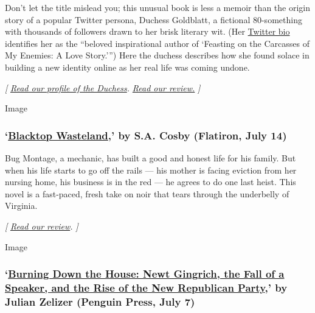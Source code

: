 Don't let the title mislead you; this unusual book is less a memoir than
the origin story of a popular Twitter persona, Duchess Goldblatt, a
fictional 80-something with thousands of followers drawn to her brisk
literary wit. (Her \href{https://twitter.com/duchessgoldblat}{Twitter
bio} identifies her as the ``beloved inspirational author of `Feasting
on the Carcasses of My Enemies: A Love Story.''') Here the duchess
describes how she found solace in building a new identity online as her
real life was coming undone.

\emph{{[}}
\href{https://www.nytimes.com/2020/07/01/books/becoming-duchess-goldblatt-memoir.html}{\emph{Read
our profile of the Duchess}}\emph{. \textbar{}}
\href{https://www.nytimes.com/2020/07/07/books/review/becoming-duchess-goldblatt-anonymous.html}{\emph{Read
our review.}} \emph{{]}}

Image

\hypertarget{blacktop-wasteland-by-sa-cosby-flatiron-july-14}{%
\subsubsection{\texorpdfstring{`\href{https://us.macmillan.com/books/9781250252685}{Blacktop
Wasteland},' by S.A. Cosby (Flatiron, July
14)}{`Blacktop Wasteland,' by S.A. Cosby (Flatiron, July 14)}}\label{blacktop-wasteland-by-sa-cosby-flatiron-july-14}}

Bug Montage, a mechanic, has built a good and honest life for his
family. But when his life starts to go off the rails --- his mother is
facing eviction from her nursing home, his business is in the red --- he
agrees to do one last heist. This novel is a fast-paced, fresh take on
noir that tears through the underbelly of Virginia.

\emph{{[}}
\href{https://www.nytimes.com/2020/07/17/books/review/blacktop-wasteland-s-a-crosby.html}{\emph{Read
our review}}\emph{. {]}}

Image

\hypertarget{burning-down-the-house-newt-gingrich-the-fall-of-a-speaker-and-the-rise-of-the-new-republican-party-by-julian-zelizer-penguin-press-july-7}{%
\subsubsection{\texorpdfstring{`\href{https://www.penguinrandomhouse.com/books/318517/burning-down-the-house-by-julian-e-zelizer/}{Burning
Down the House: Newt Gingrich, the Fall of a Speaker, and the Rise of
the New Republican Party},' by Julian Zelizer (Penguin Press, July
7)}{`Burning Down the House: Newt Gingrich, the Fall of a Speaker, and the Rise of the New Republican Party,' by Julian Zelizer (Penguin Press, July 7)}}\label{burning-down-the-house-newt-gingrich-the-fall-of-a-speaker-and-the-rise-of-the-new-republican-party-by-julian-zelizer-penguin-press-july-7}}


